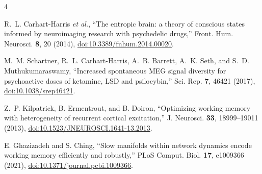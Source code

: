 \documentclass[aps,reprint,amsmath,amssymb,nofootinbib,floatfix]{revtex4-2}
\begin{document}
\begin{thebibliography}{4}

R.~L. Carhart-Harris \emph{et al.},
``The entropic brain: a theory of conscious states informed by neuroimaging
research with psychedelic drugs,'' Front. Hum. Neurosci. \textbf{8}, 20 (2014),
\href{https://doi.org/10.3389/fnhum.2014.00020}{doi:10.3389/fnhum.2014.00020}.

M.~M. Schartner, R.~L. Carhart-Harris, A.~B. Barrett, A.~K. Seth, and
S.~D. Muthukumaraswamy, ``Increased spontaneous MEG signal diversity for
psychoactive doses of ketamine, LSD and psilocybin,'' Sci. Rep. \textbf{7},
46421 (2017),
\href{https://doi.org/10.1038/srep46421}{doi:10.1038/srep46421}.

Z.~P. Kilpatrick, B. Ermentrout, and B. Doiron, ``Optimizing working memory with
heterogeneity of recurrent cortical excitation,'' J. Neurosci. \textbf{33},
18999--19011 (2013),
\href{https://doi.org/10.1523/JNEUROSCI.1641-13.2013}{doi:10.1523/JNEUROSCI.1641-13.2013}.

E. Ghazizadeh and S. Ching, ``Slow manifolds within network dynamics encode
working memory efficiently and robustly,'' PLoS Comput. Biol. \textbf{17},
e1009366 (2021),
\href{https://doi.org/10.1371/journal.pcbi.1009366}{doi:10.1371/journal.pcbi.1009366}.

\end{thebibliography}
\end{document}
